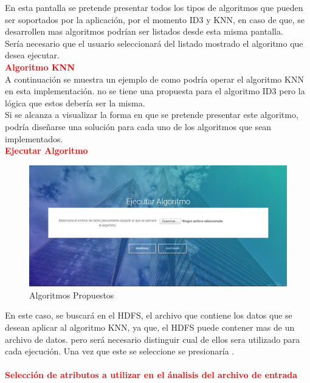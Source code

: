 En esta pantalla se pretende presentar todos los tipos de algoritmos que pueden ser soportados por la aplicación, por el momento ID3 y KNN, en caso de que, se desarrollen mas algoritmos podrían ser listados desde esta misma pantalla.\\
Sería necesario que el usuario seleccionará del listado mostrado el algoritmo que desea ejecutar.\\
\textbf{\textcolor{red}{Algoritmo KNN}}
\\
A continuación se muestra un ejemplo de como podría operar el algoritmo KNN en esta implementación. no se tiene una propuesta para el algoritmo ID3 pero la lógica que estos debería ser la misma.\\
Si se alcanza a visualizar la forma en que se pretende presentar este algoritmo, podría diseñarse una solución para cada uno de los algoritmos que sean implementados.\\
\textbf{\textcolor{red}{Ejecutar Algoritmo}}
\\
\begin{figure}[H]
	\hypertarget{fig:red}{\hspace{1pt}}
	\begin{center}
		\includegraphics[width=.9\textwidth]{capitulo7/images/seleccione.png}
		\caption{Algoritmos Propuestos}
		\label{fig:seleccione}
	\end{center}
\end{figure}
En este caso, se buscará en el HDFS, el archivo que contiene los datos que se desean aplicar al algoritmo KNN, ya que, el HDFS puede contener mas de un archivo de datos. pero será necesario distinguir cual de ellos sera utilizado para cada ejecución. 
Una vez que este se seleccione se presionaría .\\
\\
\textbf{\textcolor{red}{Selección de atributos a utilizar en el ánalisis del archivo de entrada}}

